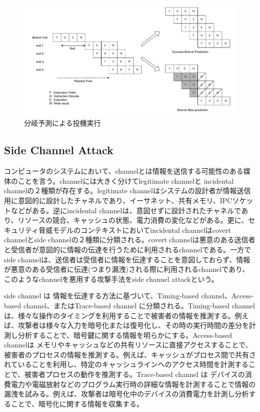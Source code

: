 \begin{figure}[tb]
  \centering
  \includegraphics[width=\linewidth]{img/Speculative_Execution.drawio.pdf}
  \caption{分岐予測による投機実行}\label{fig:Speculative_Execution}
\end{figure}


\subsection{Side Channel Attack}
コンピュータのシステムにおいて、channelとは情報を送信する可能性のある媒体のことを言う。channelには大きく分けてlegitimate channelと incidental channelの２種類が存在する\cite{intel-channel}。legitimate channelはシステムの設計者が情報送信用に意図的に設計したチャネルであり、イーサネット、共有メモリ、IPCソケットなどがある。逆にincidental channelは、意図せずに設計されたチャネルであり、リソースの競合、キャッシュの状態、電力消費の変化などがある。更に、セキュリティ脅威モデルのコンテキストにおいてincidental channelはcovert channelとside channelの２種類に分類される。covert channelは悪意のある送信者と受信者が意図的に情報の伝達を行うために利用されるchannelである。一方でside channelは、送信者は受信者に情報を伝達することを意図しておらず、情報が悪意のある受信者に伝達(つまり漏洩)される際に利用されるchannelであり、このようなchannelを悪用する攻撃手法をside channel attackという。\par 

side channel は 情報を伝達する方法に基づいて、Timing-based channel、Access-based channel、またはTrace-based channel に分類される\cite{szefer2019survey}。Timing-based channel は、様々な操作のタイミングを利用することで被害者の情報を推測する。例えば、攻撃者は様々な入力を暗号化または復号化し、その時の実行時間の差分を計測し分析することで、暗号鍵に関する情報を明らかにする\cite{song2001timing}。Access-based channelは メモリやキャッシュなどの共有リソースに直接アクセスすることで、被害者のプロセスの情報を推測する。例えば、キャッシュがプロセス間で共有されていることを利用し、特定のキャッシュラインへのアクセス時間を計測することで、被害者プロセスの動作を推測する\cite{liu2015last}。Trace-based channel は デバイスの消費電力や電磁放射などのプログラム実行時の詳細な情報を計測することで情報の漏洩を試みる。例えば、攻撃者は暗号化中のデバイスの消費電力を計測し分析することで、暗号化に関する情報を収集する\cite{aciiccmez2006trace}。\par

